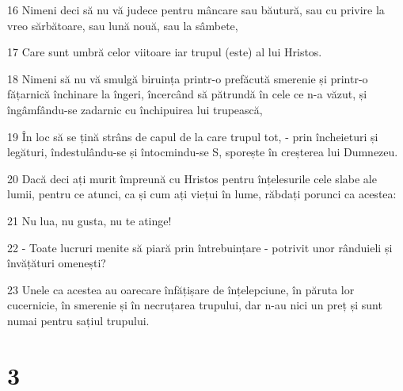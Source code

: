 \par 16 Nimeni deci să nu vă judece pentru mâncare sau băutură, sau cu privire la vreo sărbătoare, sau lună nouă, sau la sâmbete,
\par 17 Care sunt umbră celor viitoare iar trupul (este) al lui Hristos.
\par 18 Nimeni să nu vă smulgă biruința printr-o prefăcută smerenie și printr-o fățarnică închinare la îngeri, încercând să pătrundă în cele ce n-a văzut, și îngâmfându-se zadarnic cu închipuirea lui trupească,
\par 19 În loc să se țină strâns de capul de la care trupul tot, - prin încheieturi și legături, îndestulându-se și întocmindu-se S, sporește în creșterea lui Dumnezeu.
\par 20 Dacă deci ați murit împreună cu Hristos pentru înțelesurile cele slabe ale lumii, pentru ce atunci, ca și cum ați viețui în lume, răbdați porunci ca acestea:
\par 21 Nu lua, nu gusta, nu te atinge!
\par 22 - Toate lucruri menite să piară prin întrebuințare - potrivit unor rânduieli și învățături omenești?
\par 23 Unele ca acestea au oarecare înfățișare de înțelepciune, în păruta lor cucernicie, în smerenie și în necruțarea trupului, dar n-au nici un preț și sunt numai pentru sațiul trupului.

\chapter{3}

